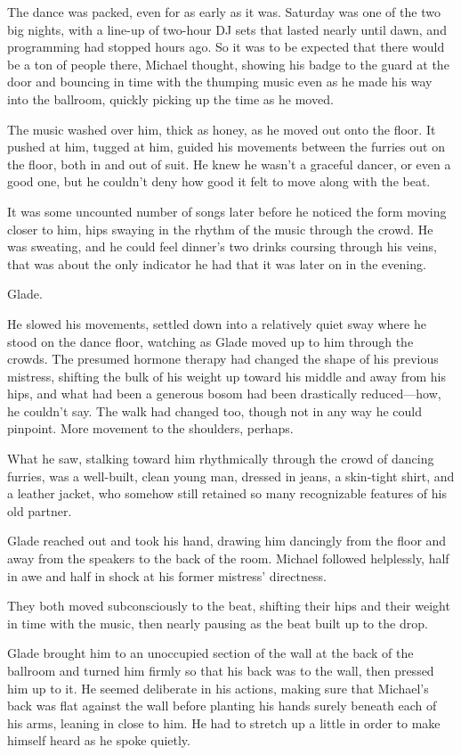 The dance was packed, even for as early as it was. Saturday was one of the two big nights, with a line-up of two-hour DJ sets that lasted nearly until dawn, and programming had stopped hours ago. So it was to be expected that there would be a ton of people there, Michael thought, showing his badge to the guard at the door and bouncing in time with the thumping music even as he made his way into the ballroom, quickly picking up the time as he moved.

The music washed over him, thick as honey, as he moved out onto the floor. It pushed at him, tugged at him, guided his movements between the furries out on the floor, both in and out of suit. He knew he wasn't a graceful dancer, or even a good one, but he couldn't deny how good it felt to move along with the beat.

It was some uncounted number of songs later before he noticed the form moving closer to him, hips swaying in the rhythm of the music through the crowd. He was sweating, and he could feel dinner's two drinks coursing through his veins, that was about the only indicator he had that it was later on in the evening.

Glade.

He slowed his movements, settled down into a relatively quiet sway where he stood on the dance floor, watching as Glade moved up to him through the crowds. The presumed hormone therapy had changed the shape of his previous mistress, shifting the bulk of his weight up toward his middle and away from his hips, and what had been a generous bosom had been drastically reduced---how, he couldn't say. The walk had changed too, though not in any way he could pinpoint. More movement to the shoulders, perhaps.

What he saw, stalking toward him rhythmically through the crowd of dancing furries, was a well-built, clean young man, dressed in jeans, a skin-tight shirt, and a leather jacket, who somehow still retained so many recognizable features of his old partner.

Glade reached out and took his hand, drawing him dancingly from the floor and away from the speakers to the back of the room. Michael followed helplessly, half in awe and half in shock at his former mistress' directness.

They both moved subconsciously to the beat, shifting their hips and their weight in time with the music, then nearly pausing as the beat built up to the drop.

Glade brought him to an unoccupied section of the wall at the back of the ballroom and turned him firmly so that his back was to the wall, then pressed him up to it. He seemed deliberate in his actions, making sure that Michael's back was flat against the wall before planting his hands surely beneath each of his arms, leaning in close to him. He had to stretch up a little in order to make himself heard as he spoke quietly.

